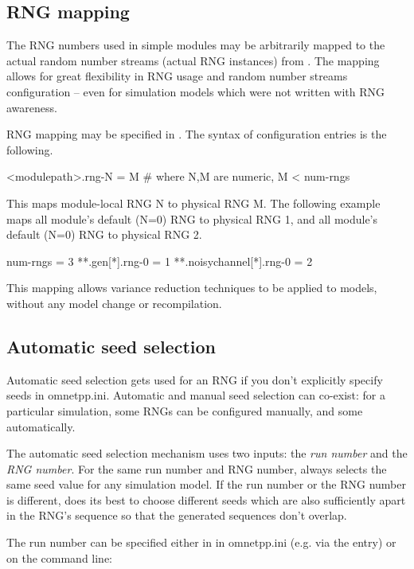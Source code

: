 \subsection{RNG mapping}

The RNG numbers used in simple modules may be arbitrarily mapped to the
actual random number streams (actual RNG instances) from .
The mapping allows for great flexibility in RNG usage and random number
streams configuration -- even for simulation models which were not
written with RNG awareness.

RNG mapping may be specified in . The syntax of
configuration entries is the following.

\begin{inifile}
[General]
<modulepath>.rng-N = M  # where N,M are numeric, M < num-rngs
\end{inifile}

This maps module-local RNG N to physical RNG M. The following
example maps all  module's default (N=0) RNG to physical RNG 1,
and all  module's default (N=0) RNG to physical RNG 2.

\begin{inifile}
[General]
num-rngs = 3
**.gen[*].rng-0 = 1
**.noisychannel[*].rng-0 = 2
\end{inifile}

This mapping allows variance reduction techniques to be applied to
{\opp} models, without any model change or recompilation.


\subsection{Automatic seed selection}

Automatic seed selection gets used for an RNG if you don't explicitly
specify seeds in omnetpp.ini. Automatic and manual seed selection can
co-exist: for a particular simulation, some RNGs can be configured
manually, and some automatically.

The automatic seed selection mechanism uses two inputs: the \textit{run number}
 and the \textit{RNG number}. For the same run number and RNG number,
{\opp} always selects the same seed value for any simulation model.
If the run number or the RNG number is different, {\opp} does its best
to choose different seeds which are also sufficiently apart in the RNG's sequence
so that the generated sequences don't overlap.

The run number can be specified either in in omnetpp.ini (e.g. via the
 entry) or on the command line:

